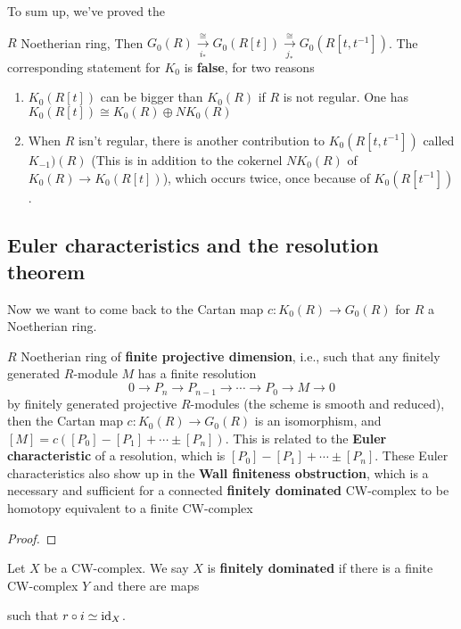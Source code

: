 \documentclass[main]{subfiles}
\begin{document}
To sum up, we've proved the

\begin{theorem}
$R$ Noetherian ring, Then $G_0(R)\xrightarrow[i_*]{\cong} G_0(R[t])\xrightarrow[j_*]{\cong} G_0(R[t,t^{-1}])$. The corresponding statement for $K_0$ is \textbf{false}, for two reasons
\begin{enumerate}[label=\alph*)]
\item $K_0(R[t])$ can be bigger than $K_0(R)$ if $R$ is not regular. One has $K_0(R[t])\cong K_0(R)\oplus NK_0(R)$
\item When $R$ isn't regular, there is another contribution to $K_0(R[t,t^{-1}])$ called $K_{-1})(R)$ (This is in addition to the cokernel $NK_0(R)$ of $K_0(R)\to K_0(R[t])$), which occurs twice, once because of $K_0(R[t^{-1}])$.
\end{enumerate}
\end{theorem}

\subsection{Euler characteristics and the resolution theorem}

Now we want to come back to the Cartan map $c:K_0(R)\to G_0(R)$ for $R$ a Noetherian ring.

\begin{theorem}
$R$ Noetherian ring of \textbf{finite projective dimension}, i.e., such that any finitely generated $R$-module $M$ has a finite resolution
\[0\to P_n\to P_{n-1}\to\cdots\to P_0\to M\to 0\]
by finitely generated projective $R$-modules (the scheme is smooth and reduced), then the Cartan map $c:K_0(R)\to G_0(R)$ is an isomorphism, and $[M]=c([P_0]-[P_1]+\cdots\pm[P_n])$. This is related to the \textbf{Euler characteristic} of a resolution, which is $[P_0]-[P_1]+\cdots\pm[P_n]$. These Euler characteristics also show up in the \textbf{Wall finiteness obstruction}, which is a necessary and sufficient for a connected \textbf{finitely dominated} CW-complex to be homotopy equivalent to a finite CW-complex
\end{theorem}

\begin{proof}

\end{proof}

\begin{definition}
Let $X$ be a CW-complex. We say $X$ is \textbf{finitely dominated} if there is a finite CW-complex $Y$ and there are maps  such that $r\circ i\simeq\operatorname{id}_X$.
\end{definition}
\end{document}
